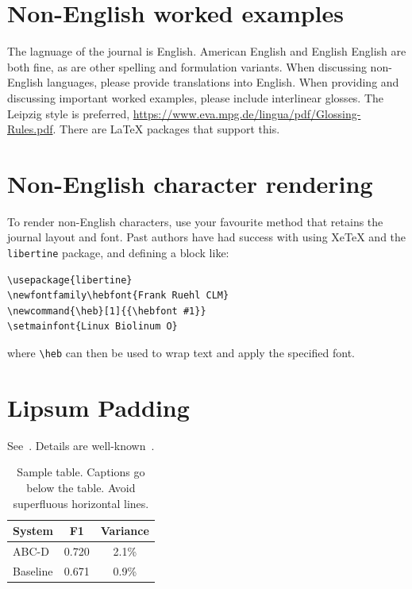 \documentclass{article}
\begin{document}
\section{Non-English worked examples}

The lagnuage of the journal is English. 
American English and English English are both fine, as are other spelling and formulation variants.
When discussing non-English languages, please provide translations into English.
When providing and discussing important worked examples, please include interlinear glosses.
The Leipzig style is preferred, \url{https://www.eva.mpg.de/lingua/pdf/Glossing-Rules.pdf}. There are LaTeX packages that support this.

\section{Non-English character rendering}

To render non-English characters, use your favourite method that retains the journal layout and font. Past authors have had success with using XeTeX and the \texttt{libertine} package, and defining a block like:

\begin{verbatim}
\usepackage{libertine}
\newfontfamily\hebfont{Frank Ruehl CLM}
\newcommand{\heb}[1]{{\hebfont #1}}
\setmainfont{Linux Biolinum O}
\end{verbatim}

where \texttt{{\textbackslash}heb} can then be used to wrap text and apply the specified font.

\section{Lipsum Padding}

See~. \lipsum[4] Details are well-known~\cite{devlin2014fast}.

\begin{table}
    \centering
    \begin{tabular}{lcc}
    \hline
    \textbf{System} & \textbf{F1} & \textbf{Variance} \\
    \hline
        ABC-D &  0.720  & 2.1\% \\
        Baseline & 0.671 & 0.9\% \\
    \hline
    \end{tabular}
    \caption{Sample table. Captions go below the table. Avoid superfluous horizontal lines.}
    \label{tab:demotable}
\end{table}
\end{document}
